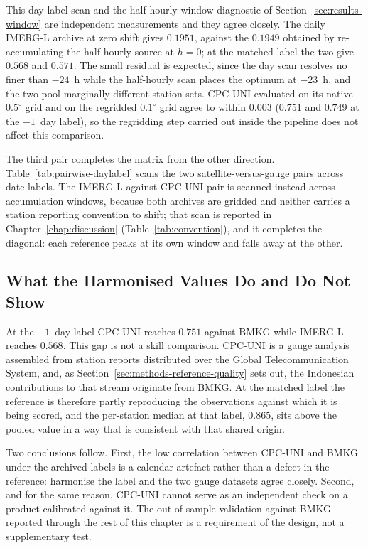 This day-label scan and the half-hourly window diagnostic of
Section~\ref{sec:results-window} are independent measurements and
they agree closely. The daily IMERG-L archive at zero shift gives
$0.1951$, against the $0.1949$ obtained by re-accumulating the
half-hourly source at $h = 0$; at the matched label the two give
$0.568$ and $0.571$. The small residual is expected, since the day
scan resolves no finer than $-24$~h while the half-hourly scan
places the optimum at $-23$~h, and the two pool marginally different
station sets. CPC-UNI evaluated on its native $0.5^{\circ}$ grid and
on the regridded $0.1^{\circ}$ grid agree to within $0.003$
($0.751$ and $0.749$ at the $-1$~day label), so the regridding step
carried out inside the pipeline does not affect this comparison.

The third pair completes the matrix from the other direction.
Table~\ref{tab:pairwise-daylabel} scans the two satellite-versus-gauge
pairs across date labels. The IMERG-L against CPC-UNI pair is scanned
instead across accumulation windows, because both archives are gridded
and neither carries a station reporting convention to shift; that scan
is reported in Chapter~\ref{chap:discussion}
(Table~\ref{tab:convention}), and it completes the diagonal: each
reference peaks at its own window and falls away at the other.

\subsection{What the Harmonised Values Do and Do Not Show}

At the $-1$~day label CPC-UNI reaches $0.751$ against BMKG while
IMERG-L reaches $0.568$. This gap is not a skill comparison.
CPC-UNI is a gauge analysis assembled from station reports
distributed over the Global Telecommunication System, and, as
Section~\ref{sec:methods-reference-quality} sets out, the
Indonesian contributions to that stream originate from BMKG. At the matched label the
reference is therefore partly reproducing the observations against
which it is being scored, and the per-station median at that label,
$0.865$, sits above the pooled value in a way that is consistent
with that shared origin.

Two conclusions follow. First, the low correlation between CPC-UNI
and BMKG under the archived labels is a calendar artefact rather
than a defect in the reference: harmonise the label and the two
gauge datasets agree closely. Second, and for the same reason,
CPC-UNI cannot serve as an independent check on a product
calibrated against it. The out-of-sample validation against BMKG
reported through the rest of this chapter is a requirement of the
design, not a supplementary test.

